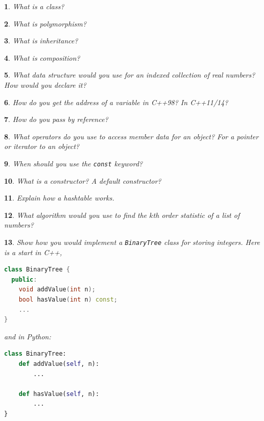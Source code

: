 \documentclass{report}
\newtheorem{problem}{}
\numberwithin{problem}{chapter} %
\begin{document}
\begin{problem}
What is a class?
\end{problem}

\begin{problem}
What is polymorphism?
\end{problem}

\begin{problem}
What is inheritance? 
\end{problem}

\begin{problem}
What is composition?
\end{problem}

\begin{problem}
What data structure would you use for an indexed collection of real numbers? How would you declare it?
\end{problem}

\begin{problem}
How do you get the address of a variable in C++98? In C++11/14?
\end{problem}

\begin{problem}
How do you pass by reference?
\end{problem}

\begin{problem}
What operators do you use to access member data for an object? For a pointer or iterator to an object?
\end{problem}

\begin{problem}
When should you use the \verb|const| keyword?
\end{problem}

\begin{problem}
What is a constructor? A default constructor? 
\end{problem}

\begin{problem}
Explain how a hashtable works.
\end{problem}

\begin{problem}
What algorithm would you use to find the $k$th order statistic of a list of numbers? 
\end{problem}

\begin{problem}
Show how you would implement a \verb|BinaryTree| class for storing integers. Here is a start in C++,
\begin{lstlisting}[language=C++]
class BinaryTree {
  public:
    void addValue(int n);
    bool hasValue(int n) const;
    ...
}
\end{lstlisting}
and in Python:
\begin{lstlisting}[language=python]
class BinaryTree:
	def addValue(self, n):
   		...
		
	def hasValue(self, n):
   		...
}
\end{lstlisting}

\end{problem}
\end{document}
